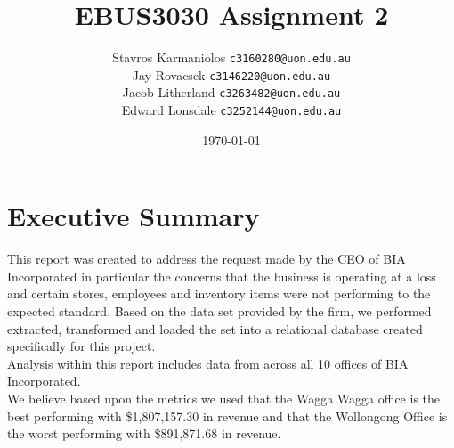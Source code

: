 \documentclass{article}
\title{EBUS3030 Assignment 2}
\author{
        Stavros Karmaniolos 
        \texttt{c3160280@uon.edu.au}\\
        Jay Rovacsek
        \texttt{c3146220@uon.edu.au}\\
        Jacob Litherland
        \texttt{c3263482@uon.edu.au}\\
        Edward Lonsdale
        \texttt{c3252144@uon.edu.au}
    }
\date{\today}
\newcommand\backgroundimage{
        \put(-5,0){
        \parbox[b][\paperheight]{\paperwidth}{
        \vfill
        \centering
        \vfill
    }}}
\begin{document}
    \lstset{style=sql}
    \AddToShipoutPicture{\backgroundimage}

    \begin{titlingpage}
        \maketitle
    \end{titlingpage}

    \tableofcontents

\newpage
    

    
    


    \section{Executive Summary}
    \label{sec:Executive Summary}
    This report was created to address the request made by the CEO of BIA Incorporated in particular the concerns that the business is operating at a loss and certain stores, employees and inventory items were not performing to the expected standard. Based on the data set provided by the firm, we performed extracted, transformed and loaded the set into a relational database created specifically for this project.\\

    \noindent
    Analysis within this report includes data from across all 10 offices of BIA Incorporated. \\
 
    \noindent
    We believe based upon the metrics we used that the Wagga Wagga office is the best performing with
    \$1,807,157.30 in revenue and that the Wollongong Office is the worst performing with
    \$891,871.68 in revenue. \\
 
\end{document}
